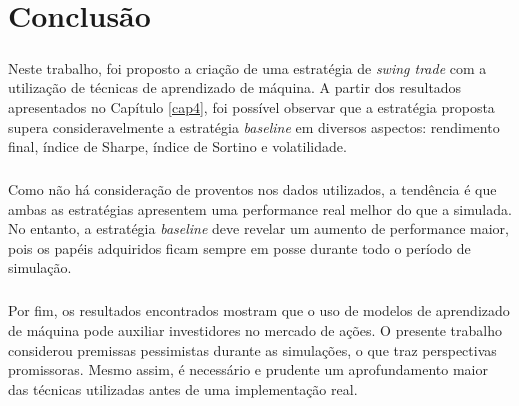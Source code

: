 \chapter{Conclusão}
\label{cap5}



\paragraph{} Neste trabalho, foi proposto a criação de uma estratégia de \textit{swing trade} com a utilização de técnicas de aprendizado de máquina. A partir dos resultados apresentados no Capítulo \ref{cap4}, foi possível observar que a estratégia proposta supera consideravelmente a estratégia \textit{baseline} em diversos aspectos: rendimento final, índice de Sharpe, índice de Sortino e volatilidade.

\paragraph{} Como não há consideração de proventos nos dados utilizados, a tendência é que ambas as estratégias apresentem uma performance real melhor do que a simulada. No entanto, a estratégia \textit{baseline} deve revelar um aumento de performance maior, pois os papéis adquiridos ficam sempre em posse durante todo o período de simulação.

\paragraph{} Por fim, os resultados encontrados mostram que o uso de modelos de aprendizado de máquina pode auxiliar investidores no mercado de ações. O presente trabalho considerou premissas pessimistas durante as simulações, o que traz perspectivas promissoras. Mesmo assim, é necessário e prudente um aprofundamento maior das técnicas utilizadas antes de uma implementação real.

